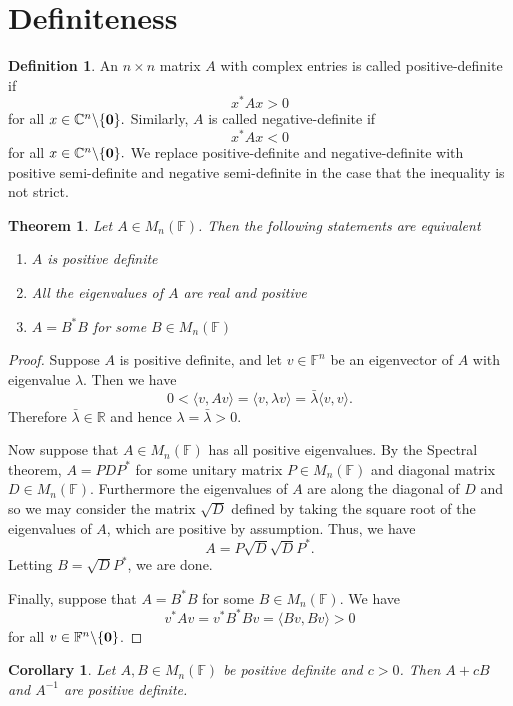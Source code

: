 \documentclass[oneside, 12pt]{book}
\newtheorem{thm}{Theorem}[section]
\newtheorem{cor}{Corollary}[section]
\theoremstyle{definition}
\newtheorem{defn}{Definition}[section]
\begin{document}
\section{Definiteness}
\begin{defn}
  \label{defn_posdef}
  An $n \times n$ matrix $A$ with complex entries is called positive-definite if \[x^{*}Ax>0\] for all $x \in \mathbb{C}^{n}\backslash\{\bold{0} \}.$
  Similarly, $A$ is called negative-definite if \[x^{*}Ax<0\] for all $x \in \mathbb{C}^{n}\backslash \{\bold{0}\}.$
  We replace positive-definite and negative-definite with positive semi-definite and negative semi-definite in the case that the inequality is not strict.
\end{defn}
\begin{thm}
  \label{thm_posdef}
  Let $A \in M_{n}(\mathbb{F})$. Then the following statements are equivalent
  \begin{enumerate}
    \item $A$ is positive definite
    \item All the eigenvalues of $A$ are real and positive
    \item $A=B^{*}B$ for some $B \in M_{n}(\mathbb{F})$
  \end{enumerate}
\end{thm}
\begin{proof}
  Suppose $A$ is positive definite, and let $v \in \mathbb{F}^{n}$ be an eigenvector of $A$ with eigenvalue $\lambda$. Then we have
  \[0<\langle v, Av \rangle = \langle v, \lambda v \rangle=\bar{\lambda} \langle v, v \rangle .\]
  Therefore $\bar{\lambda} \in \mathbb{R}$ and hence $\lambda=\bar{\lambda}>0$.

  Now suppose that $A \in M_{n}(\mathbb{F})$ has all positive eigenvalues. By the Spectral theorem, $A=PDP^{*}$ for some unitary matrix $P \in M_{n}(\mathbb{F})$ and diagonal matrix $D \in M_{n}(\mathbb{F})$. Furthermore the eigenvalues of $A$ are along the diagonal of $D$ and so we may consider the matrix $\sqrt{D}$ defined by taking the square root of the eigenvalues of $A$, which are positive by assumption. Thus, we have \[A=P\sqrt{D}\sqrt{D}P^{*}.\] Letting $B=\sqrt{D}P^{*}$, we are done.

  Finally, suppose that $A=B^{*}B$ for some $B \in M_{n}(\mathbb{F}).$
  We have \[v^{*}Av=v^{*}B^{*}Bv= \langle Bv, Bv \rangle > 0\] for all $v \in \mathbb{F}^{n} \backslash \{\bold{0}\}$.
\end{proof}
\begin{cor}
  \label{cor_posdefspace}
  Let $A,B \in M_{n}(\mathbb{F})$ be positive definite and $c>0$. Then $A+cB$ and $A^{-1}$ are positive definite.
\end{cor}
\end{document}
